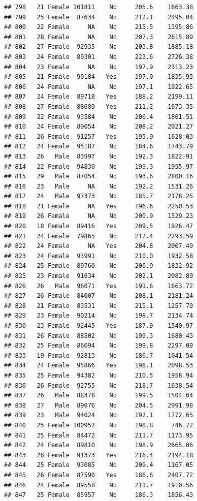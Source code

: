 \documentclass[12pt,]{krantz}
\theoremstyle{definition}
\theoremstyle{definition}
\theoremstyle{remark}
\begin{document}
\begin{verbatim}
## 798   21 Female 101811    No     205.6    1663.38
## 799   25 Female  87634    No     212.1    2495.04
## 800   22 Female     NA    No     215.5    1395.86
## 801   28 Female     NA    No     207.3    2615.89
## 802   27 Female  92935    No     203.8    1885.18
## 803   24 Female  89301    No     223.6    2726.38
## 804   23 Female     NA    No     197.9    2313.23
## 805   21 Female  90184   Yes     197.0    1835.95
## 806   24 Female     NA    No     197.1    1922.65
## 807   24 Female  89718   Yes     188.2    2199.11
## 808   27 Female  88689   Yes     211.2    1673.35
## 809   22 Female  93584    No     206.4    1801.51
## 810   24 Female  89054    No     208.2    2021.27
## 811   26 Female  91257   Yes     195.9    1628.03
## 812   24 Female  95187    No     184.6    1743.79
## 813   26   Male  83997    No     192.3    1822.91
## 814   22 Female  94830    No     199.3    1955.97
## 815   29   Male  87054    No     193.6    2800.16
## 816   23   Male     NA    No     192.2    1531.26
## 817   24   Male  97373    No     185.7    2178.25
## 818   21 Female     NA   Yes     196.6    2250.53
## 819   26 Female     NA    No     200.9    1529.23
## 820   18 Female  89416   Yes     209.5    1926.47
## 821   24 Female  79865    No     212.4    2293.59
## 822   24 Female     NA   Yes     204.8    2007.49
## 823   24 Female  93991    No     210.0    1932.58
## 824   25 Female  89760    No     206.9    1832.92
## 825   23 Female  91634    No     202.1    2082.89
## 826   26   Male  96071   Yes     191.6    1663.72
## 827   26 Female  84007    No     208.1    2181.24
## 828   21 Female  83531    No     215.1    1257.70
## 829   23 Female  90214    No     198.7    2134.74
## 830   23 Female  92445   Yes     187.9    1540.97
## 831   26 Female  88502    No     199.3    1680.43
## 832   25 Female  86094    No     199.8    2297.09
## 833   19 Female  92813    No     186.7    1041.54
## 834   24 Female  95866   Yes     198.1    2098.53
## 835   25 Female  94382    No     210.5    1958.94
## 836   26 Female  92755    No     218.7    1638.54
## 837   26   Male  88378    No     199.5    1504.64
## 838   27   Male  89076    No     204.5    2991.98
## 839   23   Male  94024    No     192.1    1772.65
## 840   25 Female 100952    No     198.8     746.72
## 841   25 Female  84472    No     211.7    1173.95
## 842   24 Female  89810    No     198.9    2665.06
## 843   26 Female  91373   Yes     216.4    2194.18
## 844   25 Female  93085    No     209.4    1167.05
## 845   26 Female  87590   Yes     186.6    2407.72
## 846   24 Female  89558    No     211.7    1910.56
## 847   25 Female  85957    No     186.3    1856.43

\end{verbatim}
\end{document}
